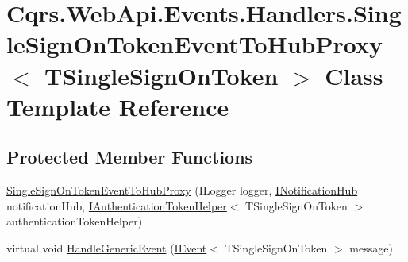\hypertarget{classCqrs_1_1WebApi_1_1Events_1_1Handlers_1_1SingleSignOnTokenEventToHubProxy}{}\section{Cqrs.\+Web\+Api.\+Events.\+Handlers.\+Single\+Sign\+On\+Token\+Event\+To\+Hub\+Proxy$<$ T\+Single\+Sign\+On\+Token $>$ Class Template Reference}
\label{classCqrs_1_1WebApi_1_1Events_1_1Handlers_1_1SingleSignOnTokenEventToHubProxy}
\subsection*{Protected Member Functions}
\begin{DoxyCompactItemize}
\item 
\hyperlink{classCqrs_1_1WebApi_1_1Events_1_1Handlers_1_1SingleSignOnTokenEventToHubProxy_ad54ad4efb19787dbf07287bf1fa7816b_ad54ad4efb19787dbf07287bf1fa7816b}{Single\+Sign\+On\+Token\+Event\+To\+Hub\+Proxy} (I\+Logger logger, \hyperlink{interfaceCqrs_1_1WebApi_1_1SignalR_1_1Hubs_1_1INotificationHub}{I\+Notification\+Hub} notification\+Hub, \hyperlink{interfaceCqrs_1_1Authentication_1_1IAuthenticationTokenHelper}{I\+Authentication\+Token\+Helper}$<$ T\+Single\+Sign\+On\+Token $>$ authentication\+Token\+Helper)
\item 
virtual void \hyperlink{classCqrs_1_1WebApi_1_1Events_1_1Handlers_1_1SingleSignOnTokenEventToHubProxy_ad8ecdd318f7dc37de14760879fd52668_ad8ecdd318f7dc37de14760879fd52668}{Handle\+Generic\+Event} (\hyperlink{interfaceCqrs_1_1Events_1_1IEvent}{I\+Event}$<$ T\+Single\+Sign\+On\+Token $>$ message)
\end{DoxyCompactItemize}
